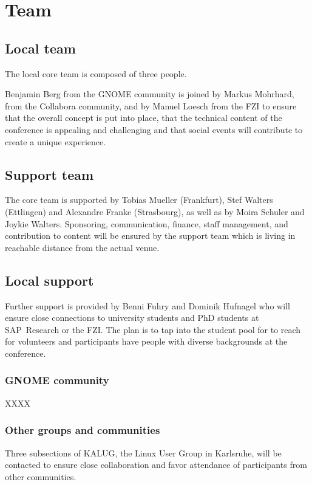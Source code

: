
\section{Team}

\subsection{Local team}
The local core team is composed of three people.

Benjamin Berg from the GNOME community is joined by Markus Mohrhard, from the Collabora community, and by Manuel Loesch from the FZI to ensure that the overall concept is put into place, that the technical content of the conference is appealing and challenging and that social events will contribute to create a unique experience.

\subsection{Support team}

The core team is supported by Tobias Mueller (Frankfurt), Stef Walters (Ettlingen) and Alexandre Franke (Strasbourg), as well as by Moira Schuler and Joykie Walters. Sponsoring, communication, finance, staff management, and contribution to content will be ensured by the support team which is living in reachable distance from the actual venue. 

\subsection{Local support}

Further support is provided by Benni Fuhry and Dominik Hufnagel who will ensure close connections to university students and PhD students at SAP~Research  or the FZI. The plan is to tap into the student pool for to reach for volunteers and participants have people with diverse backgrounds at the conference. 

\subsubsection{GNOME community}

XXXX


\subsubsection{Other groups and communities}

Three subsections of KALUG, the Linux User Group in Karlsruhe, will be contacted to ensure close collaboration and favor attendance of participants from other communities. 

